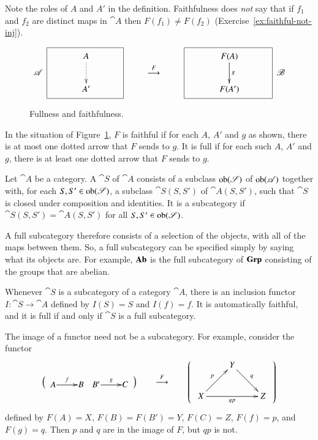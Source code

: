 \begin{warning}
Note the roles of $A$ and $A'$ in the definition.  Faithfulness does
\emph{not} say that if $f_1$ and $f_2$ are distinct maps in $\cat{A}$ then
$F(f_1) \neq F(f_2)$ (Exercise~\ref{ex:faithful-not-inj}).
%
\begin{figure}
\[
\cat{A}
\begin{array}{c}
\fbox{
\xymatrix{
\ &A\vphantom{F(A)} \ar@{.>}[d]&\ \\ &A'\vphantom{F(A')}
}
}
\end{array}
\qquad%
\toby{F}%
\qquad%
\begin{array}{c}
\fbox{
\xymatrix{
\ &F(A) \ar[d]^g&\  \\ & F(A')
}
}
\end{array}
\cat{B}
\]
\caption{Fullness and faithfulness.}
\label{fig:ff}
\end{figure}
%
In the situation of Figure~\ref{fig:ff}, $F$ is faithful if for each $A$,
$A'$ and $g$ as shown, there is at most one dotted arrow that $F$ sends to
$g$.  It is full if for each such $A$, $A'$ and $g$, there is at least one
dotted arrow that $F$ sends to $g$.
\end{warning}

\begin{defn}
Let $\cat{A}$ be a category.  A %
%
%
$\cat{S}$ of $\cat{A}$ consists of a subclass $\operatorname{ob}(\mathscr{S})$ of
$\operatorname{ob}(\mathscr{A})$ together with, for each $S, S' \in \operatorname{ob}(\mathscr{S})$, a subclass
$\cat{S}(S, S')$ of $\cat{A}(S, S')$, such that $\cat{S}$ is closed under
composition and identities.  It is a %
%
%
subcategory if $\cat{S}(S, S') = \cat{A}(S, S')$ for all $S, S'
\in \operatorname{ob}(\mathscr{S})$.
\end{defn}

A full subcategory therefore consists of a selection of the objects, with
all of the maps between them.  So, a full subcategory can be specified
simply by saying what its objects are.  For example, $\mathbf{Ab}$ is the full
subcategory of $\mathbf{Grp}$ consisting of the groups that are abelian.

Whenever $\cat{S}$ is a subcategory of a category $\cat{A}$, there is an
inclusion functor $I: \cat{S} \to \cat{A}$ defined by $I(S) = S$ and $I(f)
= f$.  It is automatically faithful, and it is full if and only if
$\cat{S}$ is a full subcategory.

\begin{warning}
The image%
%
%
%
of a functor need not be a subcategory.  For example, consider the functor
\[
\Bigl(
\begin{array}{c}
\xymatrix@1{A \ar[r]^-f&B\quad B' \ar[r]^-g&C}
\end{array}
\Bigr)
\qquad
\toby{F}
\qquad
\left(
\begin{array}{c}
\xymatrix{
        &Y \ar[dr]^q    &       \\
X \ar[ur]^p \ar[rr]_{qp} &&Z
}
\end{array}
\right)
\]
defined by $F(A) = X$, $F(B) = F(B') = Y$, $F(C) = Z$, $F(f) = p$, and $F(g) =
q$.  Then $p$ and $q$ are in the image of $F$, but $qp$ is not.
\end{warning}


